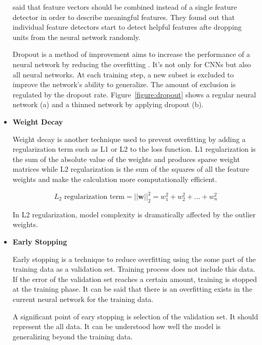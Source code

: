 \begin{itemize}
                \citet{srivastava2014dropout} said that feature vectors should be combined instead of a single feature detector in order to describe meaningful features.
                They found out that  individual feature detectors start to detect helpful features afte dropping units from the neural network randomly.

                

                Dropout is a method of improvement aims to increase the performance of a neural network by reducing the overfitting \cite{srivastava2014dropout}.
                It's not only for CNNs but also all neural networks. At each training step, a new subset is excluded to improve the network's ability to generalize.
                The amount of exclusion is regulated by the dropout rate.
                Figure~\ref{figure:dropout} shows a regular neural network (a) and a thinned network by applying dropout (b).

            \item \textbf{Weight Decay}

                Weight decay is another technique used to prevent overfitting by adding a regularization term such as L1 or L2 to the loss function.
                L1 regularization is the sum of the absolute value of the weights and produces sparse weight matrices while L2 regularization is the sum of the squares of all the feature weights and make the calculation more computationally efficient.

                $$L_2\text{ regularization term} = ||\boldsymbol w||_2^2 = {w_1^2 + w_2^2 + ... + w_n^2}$$

                In L2 regularization, model complexity is dramatically affected by the outlier weights.

            \item \textbf{Early Stopping}

                Early stopping is a technique to reduce overfitting using the some part of the training data as a validation set.
                Training process does not include this data.
                If the error of the validation set reaches a certain amount, training is stopped at the training phase.
                It can be said that there is an overfitting exists in the current neural network for the training data.

                A significant point of eary stopping is selection of the validation set.
                It should represent the all data. It can be understood how well the model is generalizing beyond the training data.

        \end{itemize}

